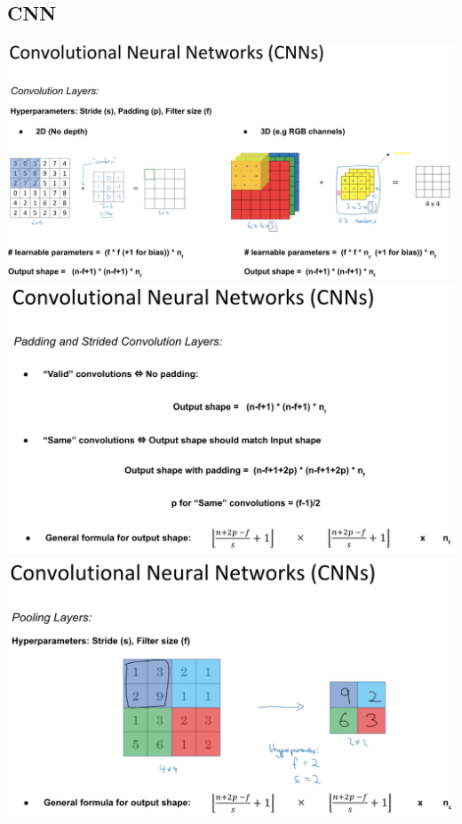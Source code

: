 \subsection*{CNN}
\includegraphics[width=\linewidth]{cnn1.png}
\includegraphics[width=\linewidth]{cnn2.png}
\includegraphics[width=\linewidth]{cnn3.png}

